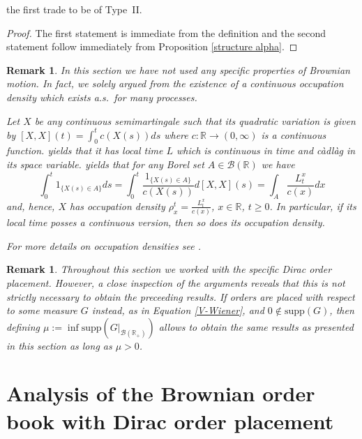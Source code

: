 \documentclass[11pt]{scrartcl}
\newtheorem{remark}[theorem]{Remark}
\begin{document}
the first trade to be of Type~II.
\begin{proof}
  The first statement is immediate from the definition and the second 
  statement follow immediately from Proposition \ref{structure alpha}.
\end{proof}
%
%
\begin{remark}
In this section we have not used any specific properties of Brownian
motion. In fact, we solely argued from the existence of a continuous
occupation density which exists a.s.\ for many processes. 

Let $X$ be any continuous semimartingale such that its quadratic variation
is given by $[X,X](t) = \int_0^t c(X(s)) ds$ where $c:\mathbb{R}%
\rightarrow(0,\infty)$ is a continuous function. \cite[VI.1.7]{RY} yields
that it has local time $L$ which is continuous in time and c\`adl\`ag in its
space variable. \cite[Corollary VI.1.6]{RY} yields that for any Borel set $%
A\in\mathcal{B}(\mathbb{R})$ we have 
\begin{equation*}
\int_0^t 1_{\{X(s)\in A\}} ds = \int_0^t \frac{1_{\{X(s)\in A\}}}{c(X(s))}
d[X,X](s) = \int_{A} \frac{L_t^x}{c(x)} dx
\end{equation*}
and, hence, $X$ has occupation density $\rho^t_x = \frac{L_t^x}{c(x)}$, $x\in%
\mathbb{R}$, $t\geq0$. In particular, if its local time posses a continuous
version, then so does its occupation density.

For more details on occupation densities see \cite{geman.horowitz.80}.
\end{remark}
%
\begin{remark}
Throughout this section we worked with the specific Dirac order placement.
However, a close inspection of the arguments reveals that this is not
strictly necessary to obtain the preceeding results. If orders are placed
with respect to some measure $G$ instead, as in Equation \eqref{V-Wiener},
and $0\notin \mathrm{supp}(G)$, then defining $\mu := \inf\mathrm{supp}(G|_{\mathcal{B}(\mathbb{R}_+)})$ 
allows to obtain the same results as presented
in this section as long as $\mu>0$.
\end{remark}
\section{Analysis of the Brownian order book with Dirac order placement}
\end{document}
